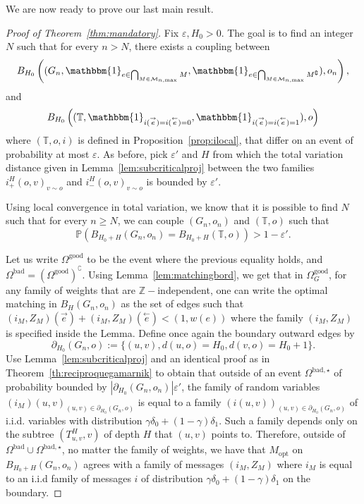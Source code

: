 \documentclass[11pt]{article}
\newcommand{\eps}{\varepsilon}
\begin{document}
\bigskip

We are now ready to prove our last main result.

\begin{proof}[Proof of Theorem~\ref{thm:mandatory}]
    Fix $\eps,H_0>0$. The goal is to find an integer $N$ such that for every $n > N$, there exists a coupling between    \[ B_{H_0}\left((G_n, \mathbbm{1}_{e \in \bigcap_{M \in \mathcal{M}_{n,\max}}M},\mathbbm{1}_{e \in \bigcap_{M \in \mathcal{M}_{n,\max}} M^{\complement}} ),o_n\right),   \]
    and
    \[ B_{H_0}\left((\mathbb{T}, \mathbbm{1}_{i(\overset{\rightarrow}{e})=i(\overset{\leftarrow}{e})=0}, \mathbbm{1}_{i(\overset{\rightarrow}{e})= i(\overset{\leftarrow}{e})=1}),o\right) \]
    where $(\mathbb T,o,i)$ is defined in Proposition~\ref{prop:ilocal},
    that differ on an event of probability at most $\eps$.
    As before, pick $\eps'$ and $H$ from which the total variation distance given in Lemma~\ref{lem:subcriticalproj} between the two families $i_+^{H}(o,v)_{v \sim o}$ and $i_-^{H}(o,v)_{v \sim o}$ is bounded by $\eps'$.
   
    Using local convergence in total variation, we know that it is possible to find $N$ such that for every $n \geq N$, we can couple $(G_n,o_n)$ and $(\mathbb{T},o)$ such that
    \[ \mathbb{P}\left(B_{H_0+H}(G_n,o_n) = B_{H_0+H}(\mathbb{T},o) \right)>1-\eps'. \]
    
    

    Let us write $\Omega^{\mathrm{good}}$ to be the event where the previous equality holds, and $\Omega^{\mathrm{bad}}=(\Omega^{\mathrm{good}})^{\complement}$. Using Lemma~\ref{lem:matchingbord}, we get that in $\Omega^{\mathrm{good}}_G$, for any family of weights that are $\mathbb{Z}-$independent, one can write the optimal matching in $B_H(G_n,o_n)$ as the set of edges such that $(i_M,Z_M)(\overset{\rightarrow}{e})+(i_M,Z_M)(\overset{\leftarrow}{e})<(1,w(e))$ where the family $(i_M,Z_M)$ is specified inside the Lemma.
    Define once again the boundary outward edges by
    \[\partial_{H_0}(G_n,o):= \{(u,v), d(u,o)=H_0, d(v,o)=H_0+1\}.\]
    Use Lemma~\ref{lem:subcriticalproj} and an identical proof as in Theorem~\ref{th:reciproquegamarnik}  to obtain that outside of an event $\Omega^{\mathrm{bad},\star}$ of probability bounded by $|\partial_{H_0}(G_n,o_n)|\eps'$, the family of  random variables $(i_M)(u,v)_{(u,v) \in  \partial_{H_0}(G_n,o)}$ is equal to a family $(i(u,v))_{(u,v) \in \partial_{H_0}(G_n,o)}$ of i.i.d. variables with distribution $\gamma \delta_0 +(1-\gamma)\delta_1$. Such a family depends only on the subtree $(T^{H}_{u,v},v)$ of depth $H$ that $(u,v)$ points to.
    Therefore, outside of $\Omega^{\mathrm{bad}}\cup\Omega^{\mathrm{bad},\star}$, no matter the family of weights, we have that $M_{\mathrm{opt}}$ on $B_{H_0+H}(G_n,o_n)$ agrees with a family of messages $(i_M,Z_M)$ where $i_M$ is equal to an i.i.d family of messages $i$ of distribution $\gamma\delta_0+(1-\gamma)\delta_1$ on the boundary.


\end{proof}
\end{document}
